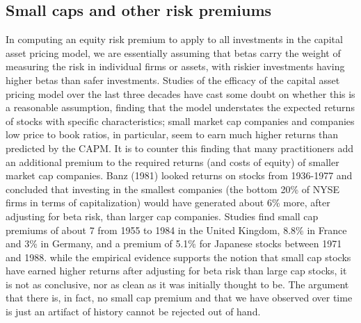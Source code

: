 \documentclass[12 pt]{article}
\begin{document}
\subsection{Small caps and other risk premiums}
In computing an equity risk premium to apply to all investments in the capital
asset pricing model, we are essentially assuming that betas carry the weight of measuring
the risk in individual firms or assets, with riskier investments having higher betas than
safer investments. Studies of the efficacy of the capital asset pricing model over the last
three decades have cast some doubt on whether this is a reasonable assumption, finding
that the model understates the expected returns of stocks with specific characteristics;
small market cap companies and companies low price to book ratios, in particular, seem
to earn much higher returns than predicted by the CAPM. It is to counter this finding that
many practitioners add an additional premium to the required returns (and costs of
equity) of smaller market cap companies. Banz (1981) looked
returns on stocks from 1936-1977 and concluded that investing in the smallest companies
(the bottom 20\% of NYSE firms in terms of capitalization) would have generated about
6\% more, after adjusting for beta risk, than larger cap companies. Studies find small cap premiums of about 7%
from 1955 to 1984 in the United Kingdom, 8.8\% in France and 3\% in Germany, and a
premium of 5.1\% for Japanese stocks between 1971 and 1988. while the empirical evidence supports the notion that small cap
stocks have earned higher returns after adjusting for beta risk than large cap stocks, it is
not as conclusive, nor as clean as it was initially thought to be. The argument that there is,
in fact, no small cap premium and that we have observed over time is just an artifact of
history cannot be rejected out of hand.
\end{document}
